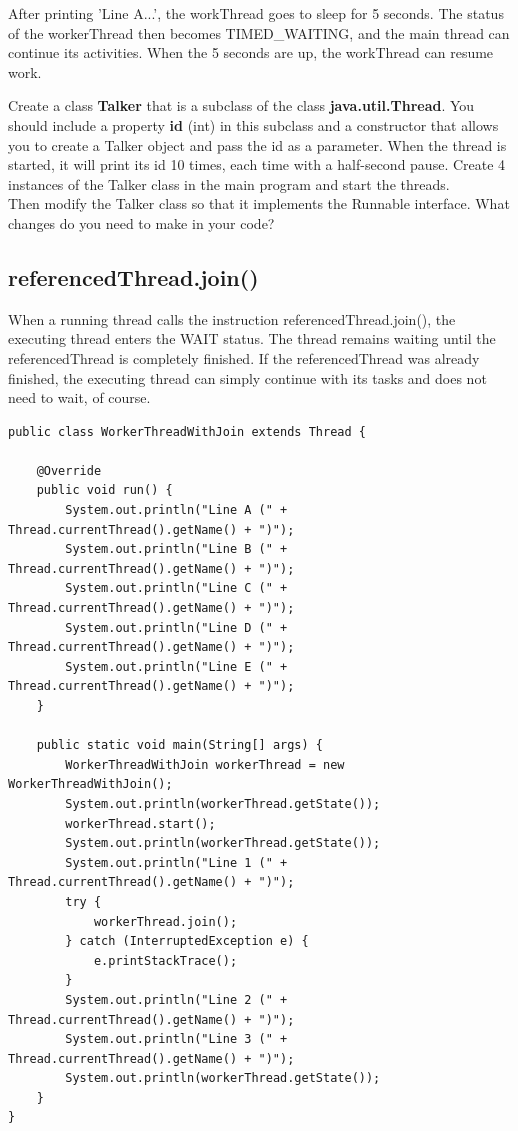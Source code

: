 After printing 'Line A...', the workThread goes to sleep for 5 seconds. The status of the workerThread then becomes TIMED_WAITING, and the main thread can continue its activities. When the 5 seconds are up, the workThread can resume work.

\begin{oefening}
Create a class \textbf{Talker} that is a subclass of the class \textbf{java.util.Thread}.
You should include a property \textbf{id} (int) in this subclass and a constructor that allows you to create a Talker object and pass the id as a parameter.
When the thread is started, it will print its id 10 times, each time with a half-second pause.
Create 4 instances of the Talker class in the main program and start the threads.
\\
Then modify the Talker class so that it implements the Runnable interface. What changes do you need to make in your code?
\end{oefening}

\subsection{referencedThread.join()}

When a running thread calls the instruction referencedThread.join(), the executing thread enters the WAIT status. The thread remains waiting until the referencedThread is completely finished. If the referencedThread was already finished, the executing thread can simply continue with its tasks and does not need to wait, of course.


\begin{lstlisting}
public class WorkerThreadWithJoin extends Thread {

	@Override
	public void run() {
		System.out.println("Line A (" + Thread.currentThread().getName() + ")");
		System.out.println("Line B (" + Thread.currentThread().getName() + ")");
		System.out.println("Line C (" + Thread.currentThread().getName() + ")");
		System.out.println("Line D (" + Thread.currentThread().getName() + ")");
		System.out.println("Line E (" + Thread.currentThread().getName() + ")");
	}

	public static void main(String[] args) {
		WorkerThreadWithJoin workerThread = new WorkerThreadWithJoin();
		System.out.println(workerThread.getState());
		workerThread.start();
		System.out.println(workerThread.getState());
		System.out.println("Line 1 (" + Thread.currentThread().getName() + ")");
		try {
			workerThread.join();
		} catch (InterruptedException e) {
			e.printStackTrace();
		}
		System.out.println("Line 2 (" + Thread.currentThread().getName() + ")");
		System.out.println("Line 3 (" + Thread.currentThread().getName() + ")");
		System.out.println(workerThread.getState());
	}
}
\end{lstlisting}

